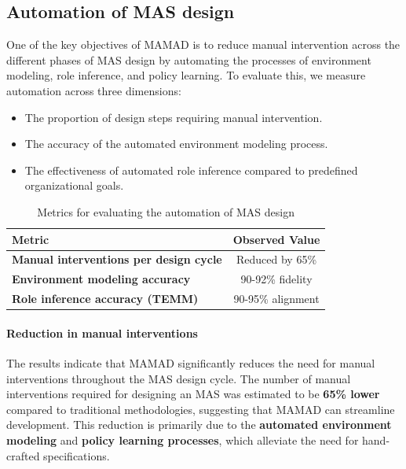 \documentclass[pdflatex,sn-mathphys-num]{sn-jnl}%
\theoremstyle{thmstyleone}%
\theoremstyle{thmstyletwo}%
\theoremstyle{thmstylethree}%
\begin{document}
\subsection{Automation of MAS design}

One of the key objectives of MAMAD is to reduce manual intervention across the different phases of MAS design by automating the processes of environment modeling, role inference, and policy learning. To evaluate this, we measure automation across three dimensions:

\begin{itemize}
    \item The proportion of design steps requiring manual intervention.
    \item The accuracy of the automated environment modeling process.
    \item The effectiveness of automated role inference compared to predefined organizational goals.
\end{itemize}

\begin{table}[h!]
    \centering
    \caption{Metrics for evaluating the automation of MAS design}
    \begin{tabular}{|l|c|}
        \hline
        \textbf{Metric} & \textbf{Observed Value} \\
        \hline
        \textbf{Manual interventions per design cycle} & Reduced by 65\% \\
        \hline
        \textbf{Environment modeling accuracy} & 90-92\% fidelity \\
        \hline
        \textbf{Role inference accuracy (TEMM)} & 90-95\% alignment \\
        \hline
    \end{tabular}
    \label{tab:automation}
\end{table}

\paragraph{Reduction in manual interventions} 
The results indicate that MAMAD significantly reduces the need for manual interventions throughout the MAS design cycle. The number of manual interventions required for designing an MAS was estimated to be \textbf{65\% lower} compared to traditional methodologies, suggesting that MAMAD can streamline development. This reduction is primarily due to the \textbf{automated environment modeling} and \textbf{policy learning processes}, which alleviate the need for hand-crafted specifications.
\end{document}
